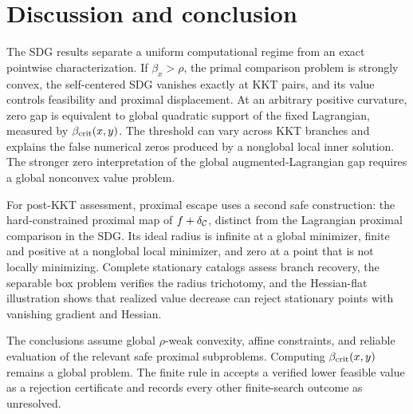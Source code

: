 \FloatBarrier
\section{Discussion and conclusion}
\label{sec:discussion}

The SDG results separate a uniform computational regime from an exact
pointwise characterization.  If \(\beta_x>\rho\), the primal comparison
problem is strongly convex, the self-centered SDG vanishes exactly at KKT
pairs, and its value controls feasibility and proximal displacement.  At an
arbitrary positive curvature, zero gap is equivalent to global quadratic
support of the fixed Lagrangian, measured by \(\beta_{\mathrm{crit}}(x,y)\).  The
threshold can vary across KKT branches and explains the false numerical zeros
produced by a nonglobal local inner solution.  The stronger zero
interpretation of the global augmented-Lagrangian gap requires a global
nonconvex value problem.

For post-KKT assessment, proximal escape uses a second safe construction: the
hard-constrained proximal map of \(f+\delta_{\mathcal{C}}\), distinct from the
Lagrangian proximal comparison in the SDG.  Its ideal radius is infinite at a
global minimizer, finite and positive at a nonglobal local minimizer, and zero
at a point that is not locally minimizing.  Complete stationary catalogs
assess branch recovery, the separable box problem verifies the radius
trichotomy, and the Hessian-flat illustration shows that realized value decrease
can reject stationary points with vanishing gradient and Hessian.

The conclusions assume global \(\rho\)-weak convexity, affine constraints, and
reliable evaluation of the relevant safe proximal subproblems.  Computing
\(\beta_{\mathrm{crit}}(x,y)\) remains a global problem.  The finite rule in
 accepts a verified lower feasible value as a
rejection certificate and records every other finite-search outcome as
unresolved.
